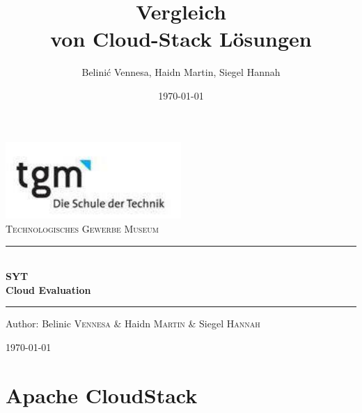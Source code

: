 \documentclass[a4paper,nochapterprefix,english,12pt]{scrreprt}
\title{Vergleich\\von Cloud-Stack Lösungen}
\author{Belinić Vennesa, Haidn Martin, Siegel Hannah}
\date{\today}
\begin{document}
\begin{titlepage}
\begin{center}
\includegraphics[width=0.5\textwidth]{logo}\\[1cm]    

\textsc{\LARGE Technologisches Gewerbe Museum}\\[1.5cm]

\rule{1.0\textwidth}{1mm}
{ \huge \bfseries  \\\large SYT\\ \huge Cloud Evaluation \\[0.4cm] }

\rule{1.0\textwidth}{1mm}

\noindent 
\vspace{7cm}

\begin{center}
\large
Author: 
Belinic \textsc{Vennesa} \&
Haidn \textsc{Martin} \&
Siegel \textsc{Hannah}
\end{center}

\vfill

{\large \today}

\end{center}
\end{titlepage}

\newpage
\tableofcontents

\newpage
{}

\chapter{Apache CloudStack} \thispagestyle{fancy}
\end{document}
